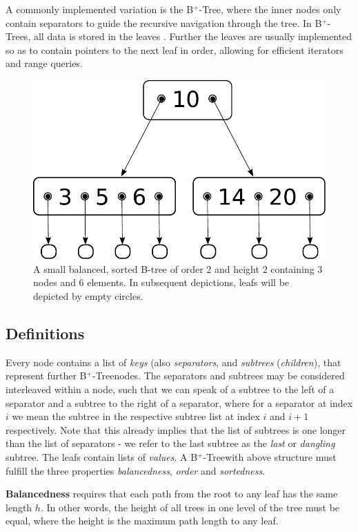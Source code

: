 \documentclass[a4paper,UKenglish,cleveref, autoref, thm-restate]{lipics-v2021}
\newcommand{\btree}{B$^+$-Tree}
\newcommand{\btrees}{B$^+$-Trees}
\begin{document}
A commonly implemented variation is the \btree, where the inner nodes
only contain separators to guide the recursive navigation through the tree.
In \btrees, all data is stored in the leaves \cite{DBLP:journals/csur/Comer79}.
Further the leaves are usually implemented so as to contain pointers
to the next leaf in order, allowing for efficient iterators and range queries.

\begin{figure}
    \centering
    \includegraphics[width=0.5\linewidth]{figures/btree-basic-nopair.pdf}
    \caption[A small example B-Tree]{A small balanced, sorted B-tree of order $2$ and
    height $2$ containing $3$ nodes and $6$ elements.
    In subsequent depictions, leafs will be depicted
    by empty circles.}
    \label{fig:btree-basic-nopair}
\end{figure}


\subsection{Definitions}
\label{sec:data_structure_defs}

Every node contains a list of \textit{keys} (also \textit{separators}, and \textit{subtrees} (\textit{children}),
that represent further \btree nodes.
The separators and subtrees may be considered interleaved within a node,
such that we can speak of a subtree to the left of a separator and
a subtree to the right of a separator,
where for a separator at index $i$ we mean the subtree in the respective
subtree list at index $i$ and $i+1$ respectively.
Note that this already implies that the list of subtrees is one
longer than the list of separators - we refer to the last subtree
as the \textit{last} or \textit{dangling} subtree.
The leafs contain lists of \textit{values}.
A \btree with above structure must fulfill the three properties
\textit{balancedness}, \textit{order} and \textit{sortedness}.

\textbf{Balancedness} requires
that each path from the root to any leaf has the same length $h$.
In other words, the height of all trees in one level of the tree must be equal,
where the height is the maximum path length to any leaf.
\end{document}
